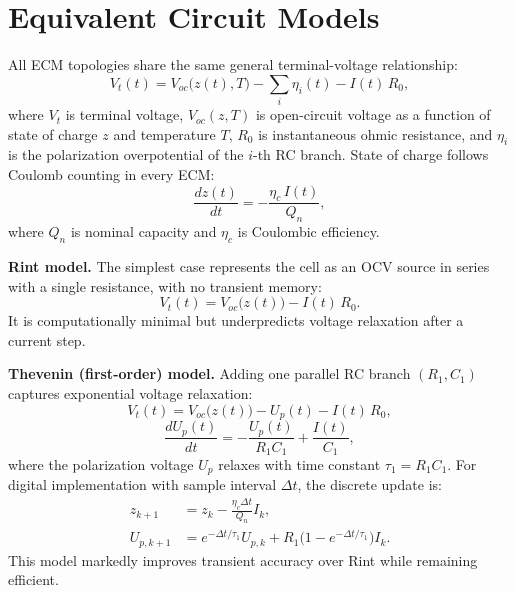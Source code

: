 \section{Equivalent Circuit Models}
\label{sec:ecm}

All ECM topologies share the same general terminal-voltage relationship:
\begin{equation}
    V_t(t) = V_{oc}\big(z(t), T\big) - \sum_{i} \eta_i(t) - I(t)\, R_0,
    \label{eq:generic_ecm}
\end{equation}
where $V_t$ is terminal voltage, $V_{oc}(z,T)$ is open-circuit voltage as a function of state of charge $z$ and temperature $T$, $R_0$ is instantaneous ohmic resistance, and $\eta_i$ is the polarization overpotential of the $i$-th RC branch. State of charge follows Coulomb counting in every ECM:
\begin{equation}
    \frac{dz(t)}{dt} = -\frac{\eta_c\, I(t)}{Q_n},
    \label{eq:coulomb_counting}
\end{equation}
where $Q_n$ is nominal capacity and $\eta_c$ is Coulombic efficiency.

\textbf{Rint model.} The simplest case represents the cell as an OCV source in series with a single resistance, with no transient memory:
\begin{equation}
    V_t(t) = V_{oc}\big(z(t)\big) - I(t)\,R_0.
    \label{eq:rint}
\end{equation}
It is computationally minimal but underpredicts voltage relaxation after a current step.

\textbf{Thevenin (first-order) model.} Adding one parallel RC branch $(R_1, C_1)$ captures exponential voltage relaxation:
\begin{equation}
    V_t(t) = V_{oc}\big(z(t)\big) - U_p(t) - I(t)\,R_0,
    \label{eq:thevenin_terminal}
\end{equation}
\begin{equation}
    \frac{dU_p(t)}{dt} = -\frac{U_p(t)}{R_1 C_1} + \frac{I(t)}{C_1},
    \label{eq:thevenin_rc}
\end{equation}
where the polarization voltage $U_p$ relaxes with time constant $\tau_1 = R_1 C_1$. For digital implementation with sample interval $\Delta t$, the discrete update is:
\begin{align}
    z_{k+1} &= z_k - \frac{\eta_c \Delta t}{Q_n} I_k, \label{eq:thevenin_ssm_z} \\
    U_{p,k+1} &= e^{-\Delta t/\tau_1} U_{p,k} + R_1\big(1 - e^{-\Delta t/\tau_1}\big) I_k. \label{eq:thevenin_ssm_u}
\end{align}
This model markedly improves transient accuracy over Rint while remaining efficient.

